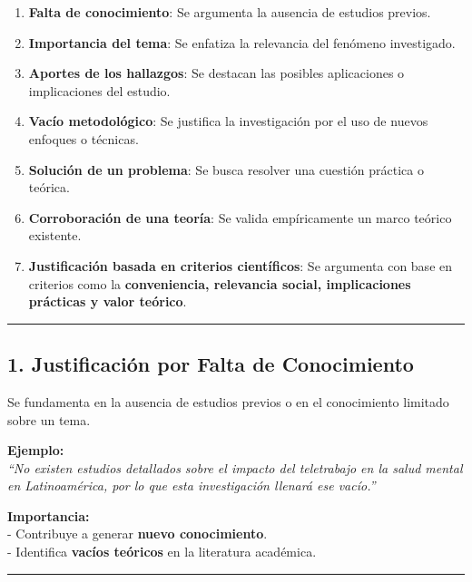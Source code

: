\documentclass[
  letterpaper,
  DIV=11,
  numbers=noendperiod]{scrartcl}
\providecommand{\tightlist}{%
  \setlength{\itemsep}{0pt}\setlength{\parskip}{0pt}}
\begin{document}
\begin{enumerate}
\def\labelenumi{\arabic{enumi}.}
\tightlist
\item
  \textbf{Falta de conocimiento}: Se argumenta la ausencia de estudios
  previos.
\item
  \textbf{Importancia del tema}: Se enfatiza la relevancia del fenómeno
  investigado.
\item
  \textbf{Aportes de los hallazgos}: Se destacan las posibles
  aplicaciones o implicaciones del estudio.
\item
  \textbf{Vacío metodológico}: Se justifica la investigación por el uso
  de nuevos enfoques o técnicas.
\item
  \textbf{Solución de un problema}: Se busca resolver una cuestión
  práctica o teórica.
\item
  \textbf{Corroboración de una teoría}: Se valida empíricamente un marco
  teórico existente.
\item
  \textbf{Justificación basada en criterios científicos}: Se argumenta
  con base en criterios como la \textbf{conveniencia, relevancia social,
  implicaciones prácticas y valor teórico}.
\end{enumerate}

\begin{center}\rule{0.5\linewidth}{0.5pt}\end{center}

\subsection{\texorpdfstring{\textbf{1. Justificación por Falta de
Conocimiento}}{1. Justificación por Falta de Conocimiento}}\label{justificaciuxf3n-por-falta-de-conocimiento}

Se fundamenta en la ausencia de estudios previos o en el conocimiento
limitado sobre un tema.

\textbf{Ejemplo:}\\
\emph{``No existen estudios detallados sobre el impacto del teletrabajo
en la salud mental en Latinoamérica, por lo que esta investigación
llenará ese vacío.''}

\textbf{Importancia:}\\
- Contribuye a generar \textbf{nuevo conocimiento}.\\
- Identifica \textbf{vacíos teóricos} en la literatura académica.

\begin{center}\rule{0.5\linewidth}{0.5pt}\end{center}
\end{document}
